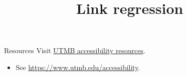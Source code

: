 \documentclass[14pt,t]{beamer}
\title{Link regression}
\begin{document}
\begin{frame}{Resources}
Visit \href{https://www.utmb.edu/accessibility}{UTMB accessibility resources}.
\begin{itemize}
\item See \url{https://www.utmb.edu/accessibility}.
\end{itemize}
\end{frame}
\end{document}
